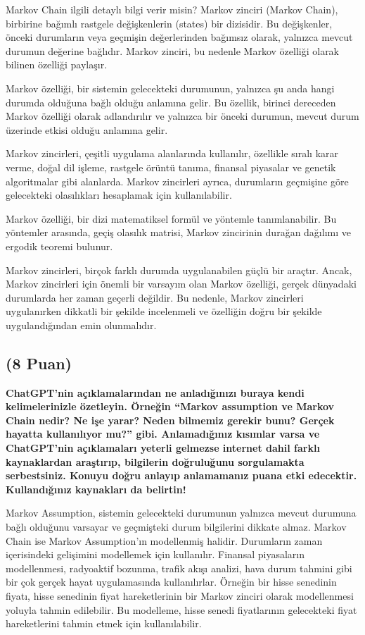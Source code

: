 \documentclass[11pt]{article}
\begin{document}
\begin{dialogue}
     Markov Chain ilgili detaylı bilgi verir misin?
    Markov zinciri (Markov Chain), birbirine bağımlı rastgele değişkenlerin (states) bir dizisidir. Bu değişkenler, önceki durumların veya geçmişin değerlerinden bağımsız olarak, yalnızca mevcut durumun değerine bağlıdır. Markov zinciri, bu nedenle Markov özelliği olarak bilinen özelliği paylaşır.

Markov özelliği, bir sistemin gelecekteki durumunun, yalnızca şu anda hangi durumda olduğuna bağlı olduğu anlamına gelir. Bu özellik, birinci dereceden Markov özelliği olarak adlandırılır ve yalnızca bir önceki durumun, mevcut durum üzerinde etkisi olduğu anlamına gelir.

Markov zincirleri, çeşitli uygulama alanlarında kullanılır, özellikle sıralı karar verme, doğal dil işleme, rastgele örüntü tanıma, finansal piyasalar ve genetik algoritmalar gibi alanlarda. Markov zincirleri ayrıca, durumların geçmişine göre gelecekteki olasılıkları hesaplamak için kullanılabilir.

Markov özelliği, bir dizi matematiksel formül ve yöntemle tanımlanabilir. Bu yöntemler arasında, geçiş olasılık matrisi, Markov zincirinin durağan dağılımı ve ergodik teoremi bulunur.

Markov zincirleri, birçok farklı durumda uygulanabilen güçlü bir araçtır. Ancak, Markov zincirleri için önemli bir varsayım olan Markov özelliği, gerçek dünyadaki durumlarda her zaman geçerli değildir. Bu nedenle, Markov zincirleri uygulanırken dikkatli bir şekilde incelenmeli ve özelliğin doğru bir şekilde uygulandığından emin olunmalıdır.
\end{dialogue}
\newpage
\subsection{(8 Puan)} \textbf{ChatGPT’nin açıklamalarından ne anladığınızı buraya kendi kelimelerinizle özetleyin. Örneğin ``Markov assumption ve Markov Chain nedir? Ne işe yarar? Neden bilmemiz gerekir bunu? Gerçek hayatta kullanılıyor mu?'' gibi. Anlamadığınız kısımlar varsa ve ChatGPT’nin açıklamaları yeterli gelmezse internet dahil farklı kaynaklardan araştırıp, bilgilerin doğruluğunu sorgulamakta serbestsiniz. Konuyu doğru anlayıp anlamamanız puana etki edecektir. Kullandığınız kaynakları da belirtin!}

Markov Assumption, sistemin gelecekteki durumunun yalnızca mevcut durumuna bağlı olduğunu varsayar ve geçmişteki durum bilgilerini dikkate almaz. Markov Chain ise Markov Assumption'ın modellenmiş halidir. Durumların zaman içerisindeki gelişimini modellemek için kullanılır. 
\newline \newline Finansal piyasaların modellenmesi, radyoaktif bozunma, trafik akışı analizi, hava durum tahmini gibi bir çok gerçek hayat uygulamasında kullanılırlar. Örneğin bir hisse senedinin fiyatı, hisse senedinin fiyat hareketlerinin bir Markov zinciri olarak modellenmesi yoluyla tahmin edilebilir. Bu modelleme, hisse senedi fiyatlarının gelecekteki fiyat hareketlerini tahmin etmek için kullanılabilir.
\end{document}
